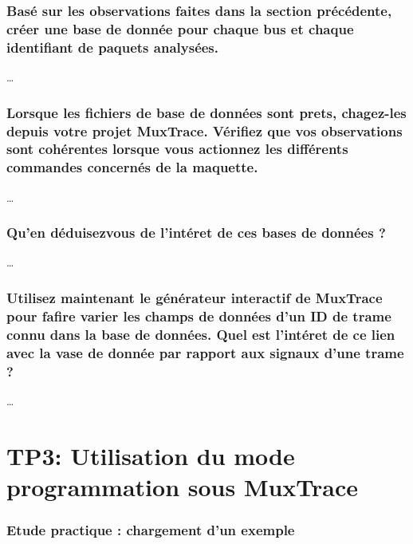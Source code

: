 \documentclass{rapportECC}
\begin{document}
\subsubsection*{Basé sur les observations faites dans la section précédente, créer une base de donnée pour chaque bus et chaque identifiant de paquets analysées.}

\dots

\subsubsection*{Lorsque les fichiers de base de données sont prets, chagez-les depuis votre projet MuxTrace. Vérifiez que vos observations sont cohérentes lorsque vous actionnez les différents commandes concernés de la maquette.}

\dots

\subsubsection*{Qu'en déduisezvous de l'intéret de ces bases de données ?}

\dots

\subsubsection*{Utilisez maintenant le générateur interactif de MuxTrace pour fafire varier les champs de données d'un ID de trame connu dans la base de données. Quel est l'intéret de ce lien avec la vase de donnée par rapport aux signaux d'une trame ?}

\dots



\section{TP3: Utilisation du mode programmation sous MuxTrace}


\subsubsection*{Etude practique : chargement d'un exemple}
\end{document}
